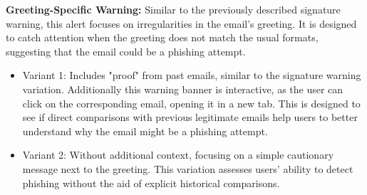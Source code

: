 \documentclass[
  a4paper,  %
  twoside,  %
  bibliography=totoc,
  headsepline,
  cleardoublepage=empty,
  parskip=half,
  draft=false
]{scrbook}
\begin{document}
\textbf{Greeting-Specific Warning:}  Similar to the previously described signature warning, this alert focuses on irregularities in the email's greeting. It is designed to catch attention when the greeting does not match the usual formats, suggesting that the email could be a phishing attempt.

\begin{itemize}
    \item Variant 1:  Includes "proof" from past emails, similar to the signature warning variation. Additionally this warning banner is interactive, as the user can click on the corresponding email, opening it in a new tab. This is designed to see if direct comparisons with previous legitimate emails help users to better understand why the email might be a phishing attempt.
    \item Variant 2: Without additional context, focusing on a simple cautionary message next to the greeting. This variation assesses users' ability to detect phishing without the aid of explicit historical comparisons.
\end{itemize}
\end{document}
